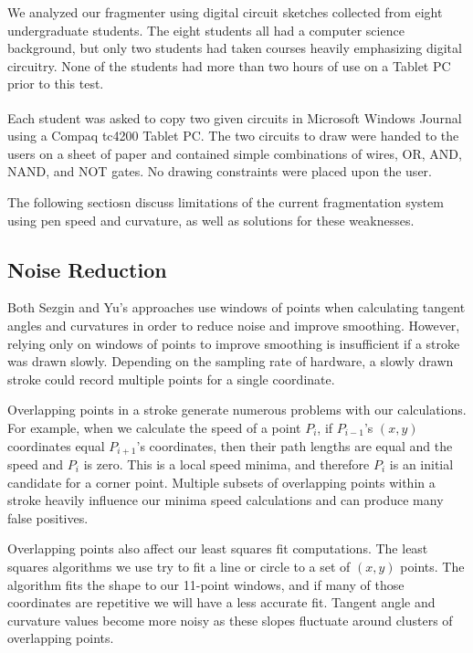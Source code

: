 \documentclass[10pt]{acmsiggraph}          %
\begin{document}
We analyzed our fragmenter using digital circuit sketches collected from eight undergraduate students. The eight students all had a computer science background, 
but only two students had taken courses heavily emphasizing digital circuitry. None of the students had more than two hours of use on a Tablet PC prior to this test.

Each student was asked to copy two given circuits in Microsoft\textsuperscript{\textregistered} Windows Journal using a Compaq tc4200 Tablet PC. The two circuits to draw
were handed to the users on a sheet of paper and contained simple combinations of wires, OR, AND, NAND, and NOT gates. No drawing constraints were placed upon the user.

The following sectiosn discuss limitations of the current fragmentation system using pen speed and curvature, as well as solutions for these weaknesses.

\subsection{Noise Reduction}

Both Sezgin and Yu's approaches use windows of points when calculating tangent angles and curvatures in order to reduce noise
and improve smoothing. However, relying only on windows of points to improve smoothing is insufficient if a stroke was drawn slowly. Depending on the sampling rate
of hardware, a slowly drawn stroke could record multiple points for a single coordinate.

Overlapping points in a stroke generate numerous problems with our calculations. For example, when we calculate the speed of a point $P_i$, if $P_{i-1}$'s $(x,y)$
coordinates equal $P_{i+1}$'s coordinates, then their path lengths are equal and the speed and $P_i$ is zero. This is a local speed minima, and therefore 
$P_i$ is an initial candidate for a corner point. Multiple subsets of overlapping points within a stroke heavily influence our minima speed calculations and
can produce many false positives.

Overlapping points also affect our least squares fit computations. The least squares algorithms we use try to fit a line or circle to a set of $(x,y)$ points.
The algorithm fits the shape to our 11-point windows, and if many of those coordinates are repetitive we will have a less accurate fit. Tangent angle and
curvature values become more noisy as these slopes fluctuate around clusters of overlapping points.

\end{document}
